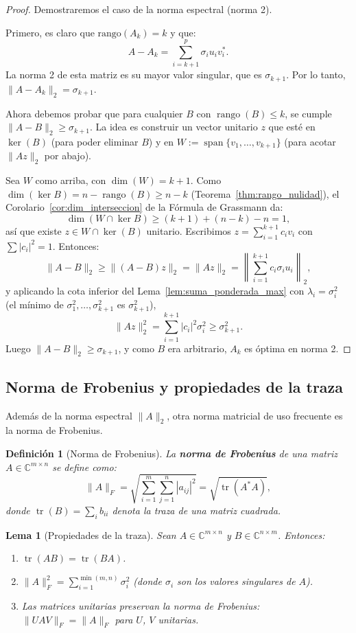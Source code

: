 \documentclass[a4paper,11pt]{report}
\newtheorem{lemma}[theorem]{Lema}
\newtheorem{definition}[theorem]{Definición}
\begin{document}
\begin{proof}
Demostraremos el caso de la norma espectral (norma 2).

Primero, es claro que $\text{rango}(A_k) = k$ y que:
\[
A - A_k = \sum_{i=k+1}^p \sigma_i u_i v_i^*.
\]
La norma 2 de esta matriz es su mayor valor singular, que es $\sigma_{k+1}$. Por lo tanto, $\|A - A_k\|_2 = \sigma_{k+1}$.

Ahora debemos probar que para cualquier $B$ con $\operatorname{rango}(B) \leq k$, se cumple $\|A - B\|_2 \geq \sigma_{k+1}$.
La idea es construir un vector unitario $z$ que esté en $\ker(B)$ (para poder eliminar $B$) y en $W := \operatorname{span}\{v_1, \ldots, v_{k+1}\}$ (para acotar $\|Az\|_2$ por abajo).

Sea $W$ como arriba, con $\dim(W) = k+1$. Como $\dim(\ker B) = n-\operatorname{rango}(B) \geq n-k$ (Teorema~\ref{thm:rango_nulidad}), el Corolario~\ref{cor:dim_interseccion} de la Fórmula de Grassmann da:
\[
\dim(W \cap \ker B) \geq (k+1)+(n-k)-n = 1,
\]
así que existe $z \in W \cap \ker(B)$ unitario. Escribimos $z = \sum_{i=1}^{k+1} c_i v_i$ con $\sum|c_i|^2=1$. Entonces:
\[
\|A-B\|_2 \geq \|(A-B)z\|_2 = \|Az\|_2
= \left\|\sum_{i=1}^{k+1} c_i\sigma_i u_i\right\|_2,
\]
y aplicando la cota inferior del Lema~\ref{lem:suma_ponderada_max} con $\lambda_i = \sigma_i^2$ (el mínimo de $\sigma_1^2,\ldots,\sigma_{k+1}^2$ es $\sigma_{k+1}^2$),
\[
\|Az\|_2^2 = \sum_{i=1}^{k+1}|c_i|^2\sigma_i^2 \geq \sigma_{k+1}^2.
\]
Luego $\|A-B\|_2 \geq \sigma_{k+1}$, y como $B$ era arbitrario, $A_k$ es óptima en norma 2.
\end{proof}

\subsection{Norma de Frobenius y propiedades de la traza}

Además de la norma espectral $\|A\|_2$, otra norma matricial de uso frecuente es la norma de Frobenius.

\begin{definition}[Norma de Frobenius]
La \textbf{norma de Frobenius} de una matriz $A \in \mathbb{C}^{m \times n}$ se define como:
\[
\|A\|_F = \sqrt{\sum_{i=1}^m \sum_{j=1}^n |a_{ij}|^2} = \sqrt{\operatorname{tr}(A^*A)},
\]
donde $\operatorname{tr}(B) = \sum_{i} b_{ii}$ denota la traza de una matriz cuadrada.
\end{definition}

\begin{lemma}[Propiedades de la traza]\label{lem:traza}
Sean $A \in \mathbb{C}^{m \times n}$ y $B \in \mathbb{C}^{n \times m}$. Entonces:
\begin{enumerate}
\item $\operatorname{tr}(AB) = \operatorname{tr}(BA)$.
\item $\|A\|_F^2 = \sum_{i=1}^{\min(m,n)} \sigma_i^2$ (donde $\sigma_i$ son los valores singulares de $A$).
\item Las matrices unitarias preservan la norma de Frobenius: $\|UAV\|_F = \|A\|_F$ para $U$, $V$ unitarias.
\end{enumerate}
\end{lemma}
\end{document}
